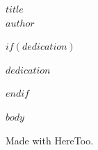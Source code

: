 \documentclass[11pt,openany]{memoir}
\begin{document}
\frontmatter

\thispagestyle{empty}
\null\vfill
\begin{center}
  {\Huge\itshape $title$}\\[2.5em]
  {\Large $author$}
\end{center}
\vfill\null
\clearpage

$if(dedication)$
\thispagestyle{empty}
\null\vfill
\begin{center}
  {\itshape $dedication$}
\end{center}
\vfill\null
\clearpage
$endif$

\tableofcontents*

\mainmatter

$body$

\backmatter
\thispagestyle{empty}
\null\vfill
\begin{center}
  {\footnotesize Made with HereToo.}
\end{center}
\vfill\null
\end{document}
